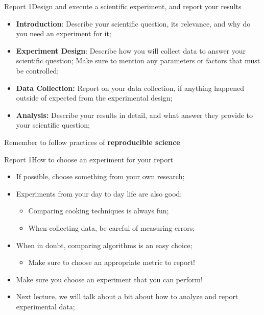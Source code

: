 \documentclass{beamer}
\begin{document}
\begin{CJK}{UTF8}{ipxm}
\begin{frame}{Report 1}{Design and execute a scientific experiment, and report your results}
  \begin{itemize}
    \item {\bf Introduction}: Describe your scientific question, its relevance, and why do you need an experiment for it;
    \item {\bf Experiment Design}: Describe how you will collect data to answer your scientific question; Make sure to mention any parameters or factors that must be controlled;
    \item {\bf Data Collection:} Report on your data collection, if anything happened outside of expected from the experimental design;
    \item {\bf Analysis:} Describe your results in detail, and what answer they provide to your scientific question;
  \end{itemize}
  \begin{alertblock}{}
    \alert{Remember to follow practices of {\bf reproducible science}}
  \end{alertblock}
\end{frame}

\begin{frame}{Report 1}{How to choose an experiment for your report}
  \begin{itemize}
    \item If possible, choose something from your own research;
    \medskip

    \item Experiments from your day to day life are also good;
    \begin{itemize}
      \item Comparing cooking techniques is always fun;
      \item When collecting data, be careful of measuring errors;
    \end{itemize}
    \medskip

    \item When in doubt, comparing algorithms is an easy choice;
    \begin{itemize}
      \item Make sure to choose an appropriate metric to report!
    \end{itemize}
    \medskip

    \item Make sure you choose an experiment that you can perform!
    \bigskip

    \item Next lecture, we will talk about a bit about how to analyze and report experimental data;
  \end{itemize}
\end{frame}


\end{CJK}
\end{document}
